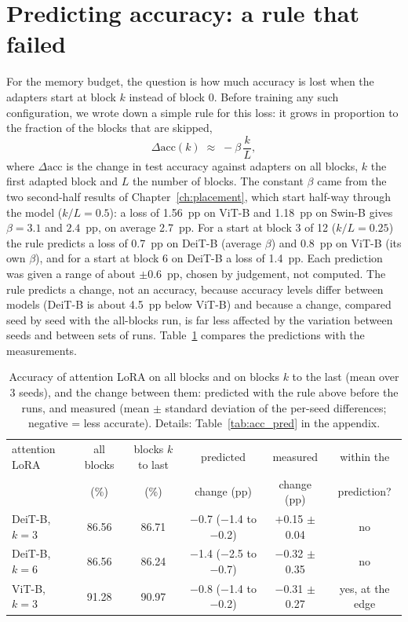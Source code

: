 \section{Predicting accuracy: a rule that failed}

For the memory budget, the question is how much accuracy is lost when the adapters start at block $k$ instead of
block 0. Before training any such configuration, we wrote down a simple rule for this loss: it grows in proportion to
the fraction of the blocks that are skipped,
\[
  \Delta\text{acc}(k) \;\approx\; -\beta\,\frac{k}{L},
\]
where $\Delta\text{acc}$ is the change in test accuracy against adapters on all blocks, $k$ the first adapted block
and $L$ the number of blocks. The constant $\beta$ came from the two second-half results of
Chapter~\ref{ch:placement}, which start half-way through the model ($k/L = 0.5$): a loss of 1.56~pp on ViT-B and
1.18~pp on Swin-B gives $\beta = 3.1$ and $2.4$~pp, on average 2.7~pp. For a start at block 3 of 12 ($k/L = 0.25$)
the rule predicts a loss of 0.7~pp on DeiT-B (average $\beta$) and 0.8~pp on ViT-B (its own $\beta$), and for a start
at block 6 on DeiT-B a loss of 1.4~pp. Each prediction was given a range of about $\pm$0.6~pp, chosen by judgement,
not computed. The rule predicts a change, not an accuracy, because accuracy levels differ between models (DeiT-B is
about 4.5~pp below ViT-B) and because a change, compared seed by seed with the all-blocks run, is far less affected
by the variation between seeds and between sets of runs. Table~\ref{tab:acc_start} compares the predictions with the
measurements.

\begin{table}[!htb]
\centering\footnotesize
\setlength{\tabcolsep}{3.5pt}
\begin{tabular}{lccccc}
\toprule
attention LoRA & all blocks & blocks $k$ to last & predicted & measured & within the \\
 & (\%) & (\%) & change (pp) & change (pp) & prediction? \\
\midrule
DeiT-B, $k=3$ & 86.56 & 86.71 & $-$0.7 ($-$1.4 to $-$0.2) & $+$0.15 $\pm$ 0.04 & no \\
DeiT-B, $k=6$ & 86.56 & 86.24 & $-$1.4 ($-$2.5 to $-$0.7) & $-$0.32 $\pm$ 0.35 & no \\
ViT-B, $k=3$  & 91.28 & 90.97 & $-$0.8 ($-$1.4 to $-$0.2) & $-$0.31 $\pm$ 0.27 & yes, at the edge \\
\bottomrule
\end{tabular}
\caption{Accuracy of attention LoRA on all blocks and on blocks $k$ to the last (mean over 3 seeds), and the change
between them: predicted with the rule above before the runs, and measured (mean $\pm$ standard deviation of the
per-seed differences; negative = less accurate). Details: Table~\ref{tab:acc_pred} in the appendix.}
\label{tab:acc_start}
\end{table}

